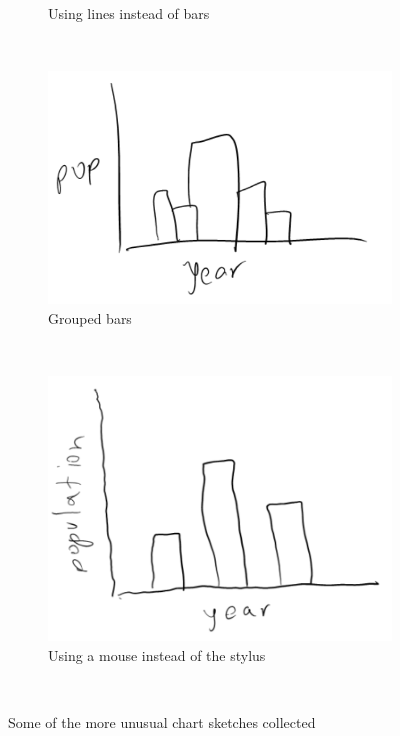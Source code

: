 \begin{figure}[H]
\begin{subfigure}[b]{0.5\textwidth}
                \caption{Using lines instead of bars}
                \label{fig:lines}
        \end{subfigure}
        ~ %
          \begin{subfigure}[b]{0.5\textwidth}
                \includegraphics[width=\textwidth]{collection3}
                \caption{Grouped bars}
                \label{fig:grouped}
        \end{subfigure}%
        ~ %
        \begin{subfigure}[b]{0.5\textwidth}
                \includegraphics[width=\textwidth]{collection4}
                \caption{Using a mouse instead of the stylus}
                \label{fig:trembling}
        \end{subfigure}
        ~ %
        \caption{Some of the more unusual chart sketches collected}\label{fig:data_collection_samples}
	\end{figure}
	
